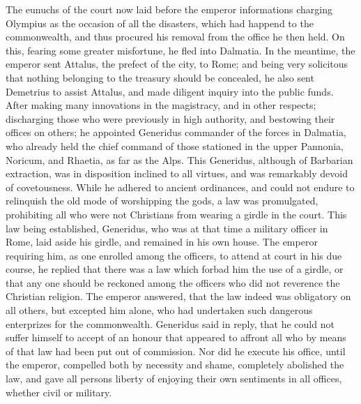 The eunuchs of the court now laid before the emperor informations charging Olympius as the occasion of all the disasters, which had happend to the commonwealth, and thus procured his removal from the office he then held. On this, fearing some greater misfortune, he fled into Dalmatia. In the meantime, the emperor sent Attalus, the prefect of the city, to Rome; and being very solicitous that nothing belonging to the treasury should be concealed, he also sent Demetrius to assist Attalus, and made diligent inquiry into the public funds. After making many innovations in the magistracy, and in other respects; discharging those who were previously in high authority, and bestowing their offices on others; he appointed Generidus commander of the forces in Dalmatia, who already held the chief command of those stationed in the upper Pannonia, Noricum, and Rhaetia, as far as the Alps. This Generidus, although of Barbarian extraction, was in disposition inclined to all virtues, and was remarkably devoid of covetousness. While he adhered to ancient ordinances, and could not endure to relinquish the old mode of worshipping the gods, a law was promulgated, prohibiting all who were not Christians from wearing a girdle in the court. This law being established, Generidus, who was at that time a military officer in Rome, laid aside his girdle, and remained in his own house. The emperor requiring him, as one enrolled among the officers, to attend at court in his due course, he replied that there was a law which forbad him the use of a girdle, or that any one should be reckoned among the officers who did not reverence the Christian religion. The emperor answered, that the law indeed was obligatory on all others, but excepted him alone, who had undertaken such dangerous enterprizes for the commonwealth. Generidus said in reply, that he could not suffer himself to accept of an honour that appeared to affront all who by means of that law had been put out of commission. Nor did he execute his office, until the emperor, compelled both by necessity and shame, completely abolished the law, and gave all persons liberty of enjoying their own sentiments in all offices, whether civil or military.

